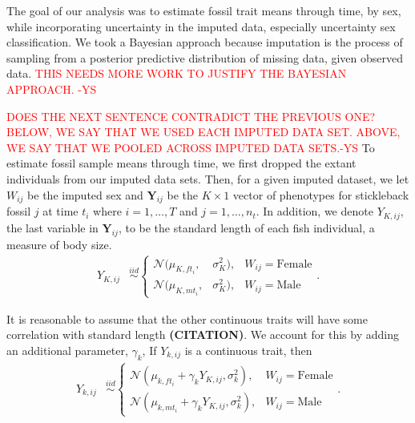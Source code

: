 \documentclass[
  12pt,
]{article}
\begin{document}
The goal of our analysis was to estimate fossil trait means through
time, by sex, while incorporating uncertainty in the imputed data,
especially uncertainty sex classification. We took a Bayesian approach
because imputation is the process of sampling from a posterior
predictive distribution of missing data, given observed data.
\textcolor{red}{THIS NEEDS MORE WORK TO JUSTIFY THE BAYESIAN APPROACH. -YS}

\textcolor{red}{DOES THE NEXT SENTENCE CONTRADICT THE PREVIOUS ONE? BELOW, WE SAY THAT WE USED EACH IMPUTED DATA SET. ABOVE, WE SAY THAT WE POOLED ACROSS IMPUTED DATA SETS.-YS}
To estimate fossil sample means through time, we first dropped the
extant individuals from our imputed data sets. Then, for a given imputed
dataset, we let \(W_{ij}\) be the imputed sex and
\(\boldsymbol{Y}_{ij}\) be the \(K \times 1\) vector of phenotypes for
stickleback fossil \(j\) at time \(t_i\) where \(i = 1, \ldots, T\) and
\(j = 1,\ldots,n_{t}\). In addition, we denote \(Y_{K,ij}\), the last
variable in \(\boldsymbol{Y}_{ij}\), to be the standard length of each
fish individual, a measure of body size. \begin{align}
{Y}_{K,ij} & \overset{iid}{\sim}\left\{\begin{array}{lll} \mathcal{N}(\mu_{K,ft_i},&\sigma_{K}^2), & W_{ij} = \text{Female} \\ \mathcal{N}(\mu_{K,mt_i},&\sigma_{K}^2), & W_{ij} = \text{Male} \end{array}\right..
\label{eq:stl}
\end{align}

It is reasonable to assume that the other continuous traits will have
some correlation with standard length \textbf{(CITATION)}. We account
for this by adding an additional parameter, \(\gamma_k\), If
\(Y_{k,ij}\) is a continuous trait, then \begin{align}
{Y}_{k,ij} & \overset{iid}{\sim}\left\{\begin{array}{llll} \mathcal{N}(\mu_{k,ft_i} + \gamma_kY_{K,ij},\sigma_k^2), & W_{ij} = \text{Female} \\ \mathcal{N}(\mu_{k,mt_i} + \gamma_kY_{K,ij},\sigma_k^2), & W_{ij} = \text{Male} \end{array}\right..
\label{eq:cont}
\end{align}
\end{document}
